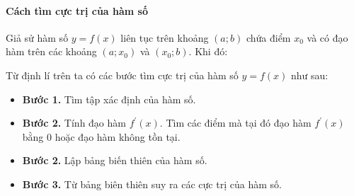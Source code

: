     \paragraph{Cách tìm cực trị của hàm số}
    \begin{dl}
        Giả sử hàm số $y=f(x)$ liên tục trên khoảng $(a; b)$ chứa điểm $x_0$ và có đạo hàm trên các khoảng $\left(a; x_0\right)$ và $\left(x_0; b\right)$. Khi đó:
    \begin{center}
    \hspace*{1.5cm}
\end{center}
    \end{dl}
\begin{note}
Từ định lí trên ta có các bước tìm cực trị của hàm số $y=f(x)$ như sau:
\begin{itemize}
\item {\bf Bước 1.} Tìm tập xác định của hàm số.
\item {\bf Bước 2.} Tính đạo hàm $f^{\prime}(x)$. Tìm các điểm mà tại đó đạo hàm $f^{\prime}(x)$ bằng $0$ hoặc đạo hàm không tồn tại.
\item {\bf Bước 2.} Lập bảng biến thiên của hàm số.
\item {\bf Bước 3.} Từ bảng biên thiên suy ra các cực trị của hàm số.
\end{itemize}
\end{note}
